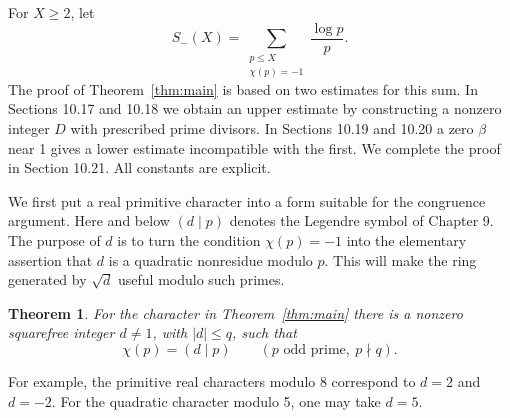 \documentclass[11pt,twoside,leqno]{article}
\theoremstyle{apostol}
\newtheorem{theorem}{Theorem}
\newcommand{\ls}[2]{(#1\mid #2)}
\begin{document}
For \(X\ge2\), let
\begin{equation}\label{eq:S}
 S_-(X)=\sum_{\substack{p\le X\\\chi(p)=-1}}\frac{\log p}{p}.
\end{equation}
The proof of Theorem~\ref{thm:main} is based on two estimates for this sum.
In Sections 10.17 and 10.18 we obtain an upper estimate by constructing a
nonzero integer \(D\) with prescribed prime divisors. In Sections 10.19 and
10.20 a zero \(\beta\) near 1 gives a lower estimate incompatible with the
first. We complete the proof in Section 10.21. All constants are explicit.

We first put a real primitive character into a form suitable for the
congruence argument. Here and below \(\ls d p\) denotes the Legendre symbol
of Chapter 9. The purpose of \(d\) is to turn the condition \(\chi(p)=-1\)
into the elementary assertion that \(d\) is a quadratic nonresidue modulo
\(p\). This will make the ring generated by \(\sqrt d\) useful modulo such
primes.

\begin{theorem}\label{thm:quadratic}
For the character in Theorem~\ref{thm:main} there is a nonzero squarefree
integer \(d\ne1\), with \(|d|\le q\), such that
\[
 \chi(p)=\ls d p\qquad(p\text{ odd prime},\ p\nmid q).
\]
\end{theorem}

For example, the primitive real characters modulo 8 correspond to \(d=2\)
and \(d=-2\). For the quadratic character modulo 5, one may take \(d=5\).
\end{document}
